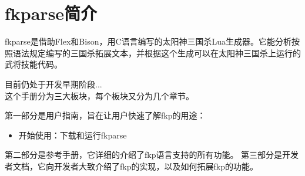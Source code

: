 \chapter{fkparse简介}

fkparse是借助Flex和Bison，用C语言编写的太阳神三国杀Lua生成器。它能分析按照语法规定编写的三国杀拓展文本，并根据这个生成可以在太阳神三国杀上运行的武将技能代码。

目前仍处于开发早期阶段... \\

这个手册分为三大板块，每个板块又分为几个章节。

第一部分是用户指南，旨在让用户快速了解fkp的用途：

\begin{itemize}
 \item 开始使用：下载和运行fkparse
\end{itemize}

第二部分是参考手册，它详细的介绍了fkp语言支持的所有功能。
第三部分是开发者文档，它向开发者大致介绍了fkp的实现，以及如何拓展fkp的功能。

